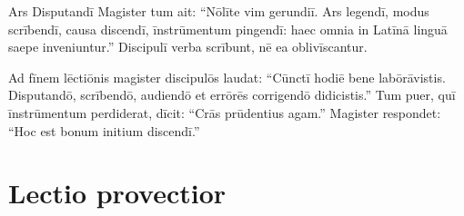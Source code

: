 \documentclass[12pt]{nextbook}
\begin{document}
\begin{readersection}{Ars Disputandī}
Magister tum ait: “Nōlīte  vim gerundiī. Ars legendī, modus scrībendī, causa discendī, īnstrūmentum pingendī: haec omnia in Latīnā linguā saepe inveniuntur.” Discipulī verba scrībunt, nē ea oblivīscantur.

Ad fīnem lēctiōnis magister  discipulōs laudat: “Cūnctī hodiē bene labōrāvistis. Disputandō, scrībendō, audiendō et errōrēs corrigendō didicistis.” Tum puer, quī īnstrūmentum perdiderat, dīcit: “Crās prūdentius agam.” Magister respondet: “Hoc est bonum initium discendī.”

\end{readersection}

\chapter{Lectio provectior}
\end{document}
